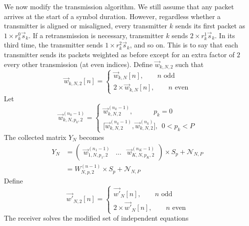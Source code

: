 \documentclass[10pt, a4paper, twocolumn]{IEEEtran}
\begin{document}
\noindent We now modify the transmission algorithm. We still assume that any packet arrives at the start of a symbol duration. However, regardless whether a transmitter is aligned or misaligned, every transmitter $k$ sends its first packet as $1\times r_k^0\overrightarrow{s}_k$. If a retransmission is necessary, transmitter $k$ sends $2\times r_k^1 \overrightarrow{s}_k$. In its third time, the transmitter sends $1\times r_k^2 \overrightarrow{s}_k$, and so on. This is to say that each transmitter sends its packets weighted as before except for an extra factor of $2$ every other transmission (at even indices). Define $\overrightarrow{w}_{k,N,2}$ such that
\begin{equation}
\overrightarrow{w}_{k,N,2}[n] = \begin{cases}
\overrightarrow{w}_{k,N}[n],\quad\quad n \text{   odd}\\
2\times\overrightarrow{w}_{k,N}[n],\quad\quad n \text{   even} 
\end{cases}
\end{equation}
\noindent Let
\begin{equation}
\overrightarrow{w}_{k,N,p_k,2}^{(n_k-1)} = \begin{cases}
\overrightarrow{w}_{k,N,2}^{(n_k-1)},\quad\quad\quad p_k = 0\\
\big[\overrightarrow{w}_{k,N,2}^{(n_k-1)},\overrightarrow{w}_{k,N,2}^{(n_k)}\big],~~0<p_k<P
\end{cases}
\end{equation}
\noindent The collected matrix $Y_N$ becomes
\begin{equation}
\label{eqY_Ndetailed3}
\begin{split}
Y_N &= \begin{pmatrix}
\overrightarrow{w}_{1,N,p_1,2}^{(n_1-1)} & \hdots & \overrightarrow{w}_{K,N,p_K,2}^{(n_K-1)}
\end{pmatrix} \times S_p + \mathcal{N}_{N,P}\\
&= W_{N,p,2}^{(n-1)}\times S_p + \mathcal{N}_{N,P}
\end{split}
\end{equation}
\noindent Define
\begin{equation}
\overrightarrow{w'}_{N,2}[n] = \begin{cases}
\overrightarrow{w'}_{N}[n],\quad\quad n \text{   odd}\\
2\times\overrightarrow{w'}_{N}[n],\quad\quad n \text{   even} 
\end{cases}
\end{equation}
\noindent The receiver solves the modified set of independent equations
\end{document}
